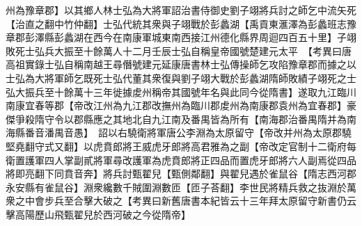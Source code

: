 州為豫章郡】以其鄉人林士弘為大將軍詔治書侍御史劉子翊將兵討之師乞中流矢死【治直之翻中竹仲翻】士弘代統其衆與子翊戰於彭蠡湖【禹貢東滙澤為彭蠡班志豫章郡彭澤縣彭蠡湖在西今在南康軍城東南西接江州德化縣界周迴四百五十里】子翊敗死士弘兵大振至十餘萬人十二月壬辰士弘自稱皇帝國號楚建元太平　【考異曰唐高祖實錄士弘自稱南越王尋僭號建元延康唐書林士弘傳操師乞攻陷豫章郡而據之以士弘為大將軍師乞既死士弘代董其衆復與劉子翊大戰於彭蠡湖隋師敗績子翊死之士弘大振兵至十餘萬十三年徙據䖍州稱帝其國號年名與此同今從隋書】遂取九江臨川南康宜春等郡【帝改江州為九江郡改撫州為臨川郡䖍州為南康郡袁州為宜春郡】豪傑爭殺隋守令以郡縣應之其地北自九江南及番禺皆為所有【南海郡治番禺隋并為南海縣番音潘禺音愚】　詔以右驍衛將軍唐公李淵為太原留守【帝改并州為太原郡驍堅堯翻守式又翻】以虎賁郎將王威虎牙郎將高君雅為之副【帝改定官制十二衛府每衛置護軍四人掌副貳將軍尋改護軍為虎賁郎將正四品而置虎牙郎將六人副焉從四品將即亮翻下同賁音奔】將兵討甄翟兒【甄側鄰翻】與翟兒遇於雀鼠谷【隋志西河郡永安縣有雀鼠谷】淵衆纔數千賊圍淵數匝【匝子荅翻】李世民將精兵救之抜淵於萬衆之中會步兵至合擊大破之【考異曰新舊唐書本紀皆云十三年拜太原留守新書仍云擊高陽歷山飛甄翟兒於西河破之今從隋帝】

